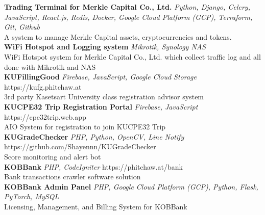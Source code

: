 {\textbf{Trading Terminal for Merkle Capital Co., Ltd.}} {\sl Python, Django, Celery, JavaScript, React.js, Redis, Docker, Google Cloud Platform (GCP), Terraform, Git, Github} \\
A system to manage Merkle Capital assets, cryptocurrencies and tokens.\\
\vspace*{2mm}
{\textbf{WiFi Hotspot and Logging system}} {\sl Mikrotik, Synology NAS} \\
WiFi Hotspot system for Merkle Capital Co., Ltd. which collect traffic log and all done with Mikrotik and NAS\\
\vspace*{2mm}
{\textbf{KUFillingGood}} {\sl Firebase, JavaScript, Google Cloud Storage} \hfill https://kufg.phitchaw.at\\
3rd party Kasetsart University class registration advisor system\\
\vspace*{2mm}
{\textbf{KUCPE32 Trip Registration Portal}} {\sl Firebase, JavaScript} \hfill https://cpe32trip.web.app\\
AIO System for registration to join KUCPE32 Trip\\
\vspace*{2mm}
{\textbf{KUGradeChecker}} {\sl PHP, Python, OpenCV, Line Notify} \hfill https://github.com/Shayennn/KUGradeChecker\\
Score monitoring and alert bot\\
\vspace*{2mm}
{\textbf{KOBBank}} {\sl PHP, CodeIgniter} \hfill https://phitchaw.at/bank\\
Bank transactions crawler software solution\\
\vspace*{2mm}
{\textbf{KOBBank Admin Panel}} {\sl PHP, Google Cloud Platform (GCP), Python, Flask, PyTorch, MySQL} \\
Licensing, Management, and Billing System for KOBBank\\
\vspace*{2mm}

